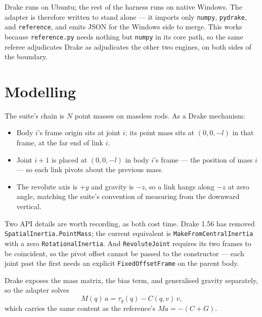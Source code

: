 \documentclass[11pt,a4paper]{article}
\begin{document}
Drake runs on Ubuntu; the rest of the harness runs on native Windows. The
adapter is therefore written to stand alone --- it imports only \texttt{numpy},
\texttt{pydrake}, and \texttt{reference}, and emits JSON for the Windows side
to merge. This works because \texttt{reference.py} needs nothing but
\texttt{numpy} in its core path, so the same referee adjudicates Drake as
adjudicates the other two engines, on both sides of the boundary.

\section{Modelling}

The suite's chain is $N$ point masses on massless rods. As a Drake mechanism:

\begin{itemize}[leftmargin=1.4em,itemsep=0.25em]
  \item Body $i$'s frame origin sits at joint $i$; its point mass sits at
        $(0,0,-l)$ in that frame, at the far end of link $i$.
  \item Joint $i+1$ is placed at $(0,0,-l)$ in body $i$'s frame --- the
        position of mass $i$ --- so each link pivots about the previous mass.
  \item The revolute axis is $+y$ and gravity is $-z$, so a link hangs along
        $-z$ at zero angle, matching the suite's convention of measuring from
        the downward vertical.
\end{itemize}

\noindent Two API details are worth recording, as both cost time. Drake 1.56
has removed \texttt{SpatialInertia.PointMass}; the current equivalent is
\texttt{MakeFromCentralInertia} with a zero \texttt{RotationalInertia}. And
\texttt{RevoluteJoint} requires its two frames to be coincident, so the pivot
offset cannot be passed to the constructor --- each joint past the first needs
an explicit \texttt{FixedOffsetFrame} on the parent body.

Drake exposes the mass matrix, the bias term, and generalised gravity
separately, so the adapter solves
\begin{equation}
M(q)\,a = \tau_g(q) - C(q,v)\,v ,
\end{equation}
which carries the same content as the reference's $Ma = -(C+G)$.

\end{document}
